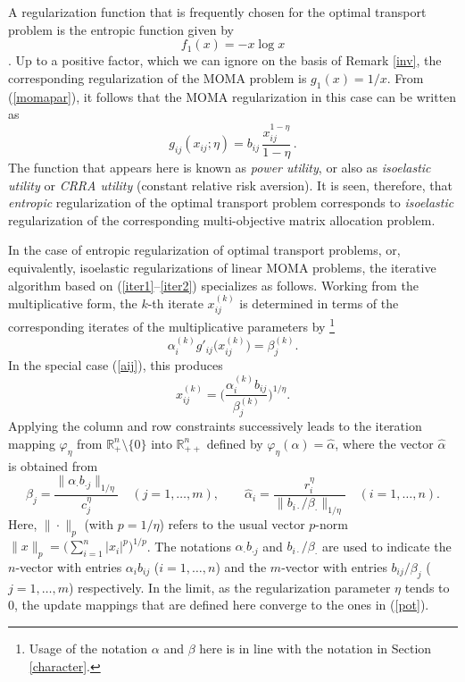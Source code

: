 \documentclass{article}
\newcommand{\mR}{\mathbb{R}}
\renewcommand{\phi}{\varphi}
\newcommand{\ki}{^{(k)}}
\newcommand{\preg}{\phi_\eta}
\theoremstyle{definition}
\renewcommand{\baselinestretch}{1.5}
\let\origfootnote\footnote
\renewcommand{\footnote}[1]{%
   \begingroup
   \renewcommand{\baselinestretch}{1}%
   \origfootnote{#1}%
   \endgroup}
\begin{document}
A regularization function that is frequently chosen for the optimal transport problem is the entropic function given by
\begin{equation}
f_1(x) = - x\log x
\end{equation}
\cite{Cuturi,Benamou,Peyre,Galichon}. Up to a positive factor, which we can ignore on the basis of Remark \ref{inv}, the corresponding regularization of the MOMA problem is $g_1(x) = 1/x$. From (\ref{momapar}), it follows that the MOMA regularization in this case can be written as
\begin{equation} \label{aij}
g_{ij}(x_{ij};\eta) = b_{ij} \, \frac{x_{ij}^{1-\eta}}{1-\eta}\,.
\end{equation}
The function that appears here is known as \emph{power utility}, or also as \emph{isoelastic utility} or \emph{CRRA utility} (constant relative risk aversion). It is seen, therefore, that \emph{entropic} regularization of the optimal transport problem corresponds to \emph{isoelastic} regularization of the corresponding multi-objective matrix allocation problem.

In the case of entropic regularization of optimal transport problems, or, equivalently, isoelastic regularizations of linear MOMA problems, the iterative algorithm based on (\ref{iter1}--\ref{iter2}) specializes as follows. Working from the multiplicative form, the $k$-th iterate $x\ki_{ij}$ is determined in terms of the corresponding iterates of the multiplicative parameters by\footnote{Usage of the notation $\alpha$ and $\beta$ here is in line with the notation in Section \ref{character}.}
$$
\alpha_i\ki g'_{ij} \big(x\ki_{ij}\big) = \beta_j\ki.
$$
In the special case (\ref{aij}), this produces
$$
x_{ij}\ki = \Bigg( \frac{\alpha_i\ki b_{ij}}{\beta_j\ki} \Bigg)^{1/\eta}.
$$
Applying the column and row constraints successively leads to the iteration mapping $\preg$ from $\mR^n_+ \setminus \{0\}$ into $\mR^n_{++}$ defined by $\preg(\alpha) = \hat{\alpha}$, where the vector $\hat{\alpha}$ is obtained from
\begin{equation} \label{updates}
\beta_j = \frac{\| \alpha_\cdot b_{\cdot j} \|_{1/\eta}}{c_j^\eta} \quad (j=1,\dots,m), \qquad
\hat{\alpha}_i = \frac{r_i^\eta}{\| b_{i\cdot}/\beta_\cdot \|_{1/\eta}} \quad (i=1,\dots,n).
\end{equation}
Here, $\| \cdot \|_p$ (with $p = 1/\eta$) refers to the usual vector $p$-norm $\|x\|_p = \big(\sum_{i=1}^n |x_i|^p\big)^{1/p}$. The notations $\alpha_\cdot b_{\cdot j}$ and $b_{i\cdot}/\beta_{\cdot}$ are used to indicate the $n$-vector with entries $\alpha_i b_{ij}$ ($i=1,\dots,n$) and the $m$-vector with entries $b_{ij}/\beta_j$ ($j=1,\dots,m$) respectively. In the limit, as the regularization parameter $\eta$ tends to 0, the update mappings that are defined here converge to the ones in (\ref{pot}).
\end{document}

